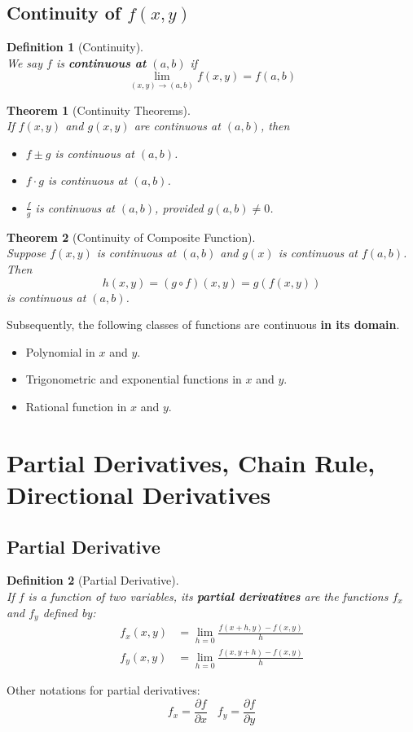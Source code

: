 \documentclass[12pt]{article}
\newtheorem{definition}{Definition}[section]
\newtheorem{theorem}{Theorem}[section]
\theoremstyle{definition}
\begin{document}
\subsection{Continuity of $f(x,y)$}
\begin{definition}[Continuity]\hfill\\\normalfont We say $f$ is \textbf{continuous at} $(a,b)$ if
\[
\lim_{(x,y)\to (a,b)}f(x,y)=f(a,b)
\]
\end{definition}
\begin{theorem}[Continuity Theorems]\hfill\\\normalfont If $f(x,y)$ and $g(x,y)$ are continuous at $(a,b)$, then
\begin{itemize}
  \item $f\pm g$ is continuous at $(a,b)$.
  \item $f\cdot g$ is continuous at $(a,b)$.
  \item $\frac{f}{g}$ is continuous at $(a,b)$, provided $g(a,b)\neq 0$.
\end{itemize}
\end{theorem}
\begin{theorem}[Continuity of Composite Function]
\hfill\\\normalfont Suppose $f(x,y)$ is continuous at $(a,b)$ and $g(x)$ is continuous at $f(a,b)$. Then
\[
h(x,y)=(g\circ f)(x,y)=g(f(x,y))
\]
is continuous at $(a,b)$.
\end{theorem}
Subsequently, the following classes of functions are continuous \textbf{in its domain}.
\begin{itemize}
  \item Polynomial in $x$ and $y$.
  \item Trigonometric and exponential functions in $x$ and $y$.
  \item Rational function in $x$ and $y$.
\end{itemize}
\clearpage
\section{Partial Derivatives, Chain Rule, Directional Derivatives}
\subsection{Partial Derivative}
\begin{definition}[Partial Derivative]
\hfill\\\normalfont If $f$ is a function of two variables, its \textbf{partial derivatives} are the functions $f_x$ and $f_y$ defined by: 
\begin{align*}
f_x(x,y)&=\lim_{h=0}\frac{f(x+h,y)-f(x,y)}{h}\\
f_y(x,y)&=\lim_{h=0}\frac{f(x,y+h)-f(x,y)}{h}
\end{align*}
\end{definition}
Other notations for partial derivatives:
\[
f_x=\frac{\partial f}{\partial x}\;\;\;f_y=\frac{\partial f}{\partial y}
\]
\end{document}
